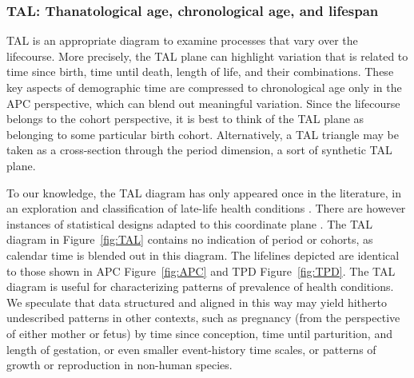 \documentclass[12pt,oneside,a4paper]{article} %
\newcommand\tgh[1]{\raisebox{-.25\height}{\texttt{[image: Figures/triadtable/triad\#1.pdf]}}}
\begin{document}

\FloatBarrier
\subsubsection{TAL: Thanatological age, chronological age, and
lifespan}%
\FloatBarrier  
TAL is an appropriate diagram to examine processes that vary over the
lifecourse.
More precisely, the TAL plane can highlight variation that is related to time
since birth, time until death, length of life, and their combinations. These
key aspects of demographic time are compressed to chronological age only in the
APC perspective, which can blend out meaningful variation. Since the lifecourse belongs to the cohort perspective, it is best to think of the TAL plane as belonging to some particular birth cohort. Alternatively, a TAL triangle may be taken as a cross-section through the period dimension, a sort of synthetic TAL plane. 

To our knowledge, the TAL diagram has only appeared once in the literature, in an exploration and classification of late-life health
conditions \citep{riffe2015ttd}. There are however instances of statistical
designs adapted to this coordinate plane \citep[see e.g.,][]{Jewell2016,
dempsey2016}. The TAL diagram in Figure~\ref{fig:TAL} contains no indication of
period or cohorts, as calendar time is blended out in this diagram.
The lifelines depicted are identical to those shown in APC Figure~\ref{fig:APC}
and TPD Figure~\ref{fig:TPD}. The TAL diagram is useful for characterizing patterns of prevalence of health conditions. We speculate
that data structured and aligned in this way may yield hitherto undescribed
patterns in other contexts, such as pregnancy (from the perspective of either
mother or fetus) by time since conception, time until parturition, and length of
gestation, or even smaller event-history time scales, or patterns of growth or reproduction in non-human species.
\end{document}
